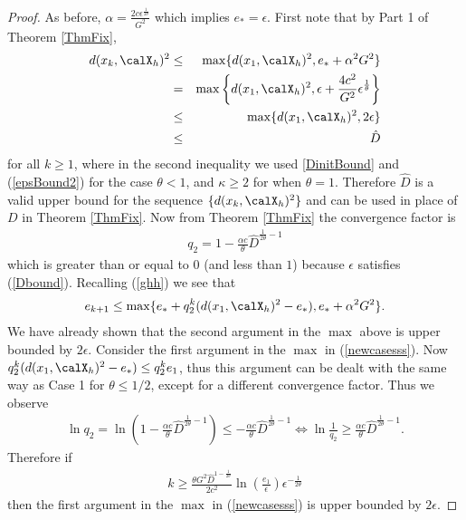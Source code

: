 \begin{proof}
  \noindent
  As before, $\alpha = \frac{2c\epsilon^{\frac{1}{2\theta}}}{G^2}$ which implies $e_*=\epsilon$.
  First note that by Part 1 of Theorem \ref{ThmFix}, 
  \begin{eqnarray*}
  d(x_k,\calX_h)^2
  &\leq& 
  \max\{d(x_1,\calX_h)^2,e_*+\alpha^2 G^2\}
  \\
  &=&
  \max\left\{d(x_1,\calX_h)^2,\epsilon+\frac{4 c^2}{G^2}\epsilon^{\frac{1}{\theta}}\right\}
  \\
  &\leq&
  \max\{d(x_1,\calX_h)^2,2\epsilon\}
  \\
  &\leq& \hat{D}
  \end{eqnarray*}
   for all $k\geq 1$, where in the second inequality we used \eqref{DinitBound} and (\ref{epsBound2}) for the case $\theta<1$, and $\kappa\geq 2$ for when $\theta=1$. Therefore $\hat{D}$ is a valid upper bound for the sequence $\{d(x_k,\calX_h)^2\}$ and can be used in place of $D$ in Theorem \ref{ThmFix}. 
    Now from Theorem \ref{ThmFix} the convergence factor is
   \begin{eqnarray*}
   	q_2=1-\frac{\alpha c}{\theta}\hat{D}^{\frac{1}{2\theta}-1}
   \end{eqnarray*}
   which is greater than or equal to $0$ (and less than $1$) because $\epsilon$ satisfies (\ref{Dbound}).
  Recalling (\ref{ghh}) we see that 
  \begin{eqnarray}\label{newcasesss}
  e_{k+1}\leq \max\{e_*+q_2^{k}(d(x_1,\calX_h)^2-e_*),e_*+\alpha^2 G^2\}.
  \end{eqnarray}
  We have already shown that the second argument in the $\max$ above is upper bounded by $2\epsilon$. 
Consider the first argument in the $\max$ in (\ref{newcasesss}). 
 Now $q_2^{k}(d(x_1,\calX_h)^2-e_*)\leq q_2^{k} e_1$, thus
this argument can be dealt with the same way as Case 1 for $\theta\leq1/2$, except for a different convergence factor. 
 Thus we observe
 \begin{eqnarray*}
  \ln q_2=\ln\left(1-\frac{\alpha c}{\theta} \hat{D}^{\frac{1}{2\theta}-1}\right)\leq -\frac{\alpha c}{\theta}  \hat{D}^{\frac{1}{2\theta}-1}\iff \ln\frac{1}{q_2}\geq \frac{\alpha c}{\theta} \hat{D}^{\frac{1}{2\theta}-1}.
  \end{eqnarray*}
  Therefore if 
  \begin{eqnarray*}
  k
  \geq
   \frac{\theta G^2 \hat{D}^{1-\frac{1}{2\theta}}}{2c^2}\ln\left(\frac{e_1}{\epsilon}\right)\epsilon^{-\frac{1}{2\theta}}
  \end{eqnarray*}
 then the first argument in the $\max$ in (\ref{newcasesss}) is upper bounded by $2\epsilon$.

 
  \end{proof} 